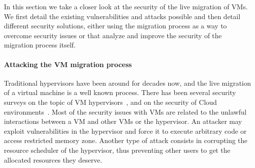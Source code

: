 In this section we take a closer look at the security of the live migration of VMs.
We first detail the existing vulnerabilities and attacks possible and then detail different security solutions, either using the migration process as a way to overcome security issues or that analyze and improve the security of the migration process itself.

\paragraph{Attacking the VM migration process}
Traditional hypervisors have been around for decades now, and the live migration of a virtual machine is a well known process. There has been several security surveys on the topic of VM hypervisors~\cite{Reuben2007,Rehman2013,Sahoo2010,Perez-Botero2013}, and on the security of Cloud environments~\cite{cloudenvironmentsecuritysurvey-fernandes2014}.
Most of the security issues with VMs are related to the unlawful interactions between a VM and other VMs or the hypervisor.
An attacker may exploit vulnerabilities in the hypervisor and force it to execute arbitrary code or access restricted memory zone.
Another type of attack consists in corrupting the resource scheduler of the hypervisor, thus preventing other users to get the allocated resources they deserve.


